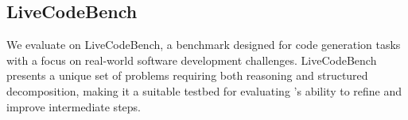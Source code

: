 





\newpage
\subsection{LiveCodeBench}
\label{sec:livecodebench_extended}

We evaluate \decomp on LiveCodeBench, a benchmark designed for code generation tasks with a focus on real-world software development challenges. LiveCodeBench presents a unique set of problems requiring both reasoning and structured decomposition, making it a suitable testbed for evaluating \decomp's ability to refine and improve intermediate steps.

